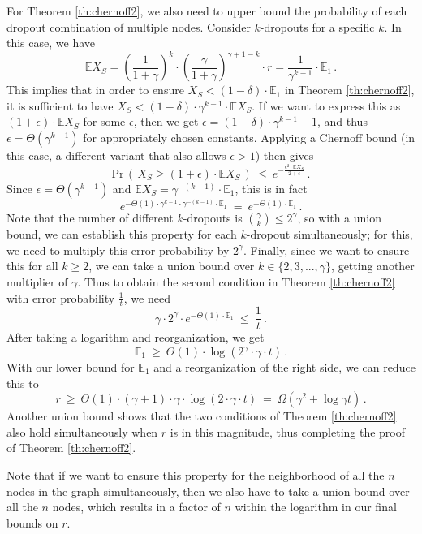 \documentclass{article}
\begin{document}
For Theorem \ref{th:chernoff2}, we also need to upper bound the probability of each dropout combination of multiple nodes. Consider $k$-dropouts for a specific $k$. In this case, we have
\[ \mathbb{E} X_S = \left( \frac{1}{1+\gamma} \right)^k \cdot \left( \frac{\gamma}{1+\gamma} \right)^{\gamma+1-k} \cdot r = \frac{1}{\gamma^{k-1}} \cdot \mathbb{E}_1 \, .\]
This implies that in order to ensure $X_S < (1\!-\!\delta) \cdot \mathbb{E}_1$ in Theorem \ref{th:chernoff2}, it is sufficient to have $X_S < (1-\delta) \cdot \gamma^{k-1} \cdot \mathbb{E} X_S$. If we want to express this as $(1 + \epsilon) \cdot \mathbb{E} X_S$ for some $\epsilon$, then we get $\epsilon = (1-\delta) \cdot \gamma^{k-1} - 1$, and thus $\epsilon = \Theta\left(\gamma^{k-1}\right)$ for appropriately chosen constants. Applying a Chernoff bound (in this case, a different variant that also allows $\epsilon>1$) then gives
\[ \text{Pr}\,\left(\, X_S \geq (1\!+\!\epsilon) \cdot \mathbb{E} X_S \, \right) \: \leq \: e ^{- \frac{\epsilon^2 \cdot \mathbb{E} X_S}{2 + \epsilon}} \, . \]
Since $\epsilon = \Theta\left(\gamma^{k-1}\right)$ and $\mathbb{E} X_S = \gamma^{-(k-1)} \cdot \mathbb{E}_1$, this is in fact
\[ e ^{- \Theta(1) \cdot \gamma^{k-1} \cdot \gamma^{-(k-1)} \cdot \mathbb{E}_1} \: = \: e ^{- \Theta(1) \cdot \mathbb{E}_1} \, . \]
Note that the number of different $k$-dropouts is ${\binom{\gamma}{k}} \leq 2^{\gamma}$, so with a union bound, we can establish this property for each $k$-dropout simultaneously; for this, we need to multiply this error probability by $2^{\gamma}$. Finally, since we want to ensure this for all $k \geq 2$, we can take a union bound over $k \in \{ 2, 3, ..., \gamma \}$, getting another multiplier of $\gamma$. Thus to obtain the second condition in Theorem \ref{th:chernoff2} with error probability $\frac{1}{t}$, we need
\[ \gamma \cdot 2^{\gamma} \cdot e ^{- \Theta(1) \cdot \mathbb{E}_1} \: \leq \: \frac{1}{t} \, . \]
After taking a logarithm and reorganization, we get
\[ \mathbb{E}_1 \: \geq \: \Theta(1) \cdot \log (2^{\gamma} \cdot \gamma \cdot t) \, . \]
With our lower bound for $\mathbb{E}_1$ and a reorganization of the right side, we can reduce this to
\[ r \: \geq \: \Theta(1) \cdot (\gamma+1) \cdot \gamma \cdot \log (2 \cdot \gamma \cdot t) \: = \: \Omega\left(\gamma^2 + \log \gamma t \right) \, . \]
Another union bound shows that the two conditions of Theorem \ref{th:chernoff2} also hold simultaneously when $r$ is in this magnitude, thus completing the proof of Theorem \ref{th:chernoff2}.

Note that if we want to ensure this property for the neighborhood of all the $n$ nodes in the graph simultaneously, then we also have to take a union bound over all the $n$ nodes, which results in a factor of $n$ within the logarithm in our final bounds on $r$.
\end{document}
